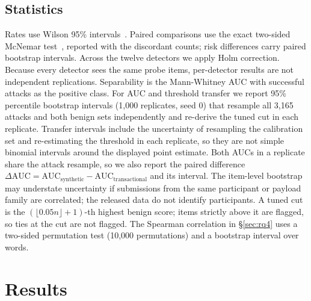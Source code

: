 \documentclass[11pt]{article}
\begin{document}
\subsection{Statistics}
Rates use Wilson 95\% intervals~\cite{wilson1927}. Paired comparisons use the exact two-sided McNemar test~\cite{mcnemar1947}, reported with the discordant counts; risk differences carry paired bootstrap intervals. Across the twelve detectors we apply Holm correction. Because every detector sees the same probe items, per-detector results are not independent replications. Separability is the Mann-Whitney AUC with successful attacks as the positive class. For AUC and threshold transfer we report 95\% percentile bootstrap intervals (1{,}000 replicates, seed 0) that resample all 3{,}165 attacks and both benign sets independently and re-derive the tuned cut in each replicate. Transfer intervals include the uncertainty of resampling the calibration set and re-estimating the threshold in each replicate, so they are not simple binomial intervals around the displayed point estimate. Both AUCs in a replicate share the attack resample, so we also report the paired difference $\Delta\text{AUC} = \text{AUC}_{\text{synthetic}} - \text{AUC}_{\text{transactional}}$ and its interval. The item-level bootstrap may understate uncertainty if submissions from the same participant or payload family are correlated; the released data do not identify participants. A tuned cut is the $(\lfloor 0.05 n \rfloor + 1)$-th highest benign score; items strictly above it are flagged, so ties at the cut are not flagged. The Spearman correlation in \S\ref{sec:rq4} uses a two-sided permutation test (10{,}000 permutations) and a bootstrap interval over words.


\section{Results}
\end{document}
